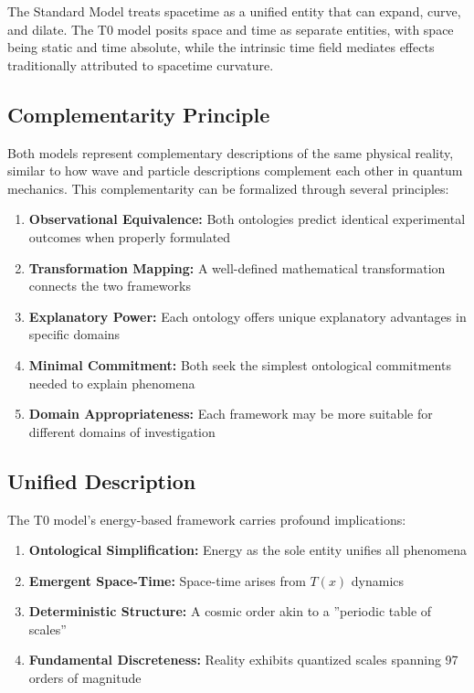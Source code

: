 \documentclass[aps,prl,twocolumn,superscriptaddress,nofootinbib]{revtex4-2}
\newcommand{\Tfield}{T(x)}
\begin{document}
	The Standard Model treats spacetime as a unified entity that can expand, curve, and dilate. The T0 model posits space and time as separate entities, with space being static and time absolute, while the intrinsic time field mediates effects traditionally attributed to spacetime curvature.
	
	\subsection{Complementarity Principle}
	\label{subsec:complementarity}
	
	Both models represent complementary descriptions of the same physical reality, similar to how wave and particle descriptions complement each other in quantum mechanics. This complementarity can be formalized through several principles:
	
	\begin{enumerate}
		\item \textbf{Observational Equivalence:} Both ontologies predict identical experimental outcomes when properly formulated
		\item \textbf{Transformation Mapping:} A well-defined mathematical transformation connects the two frameworks
		\item \textbf{Explanatory Power:} Each ontology offers unique explanatory advantages in specific domains
		\item \textbf{Minimal Commitment:} Both seek the simplest ontological commitments needed to explain phenomena
		\item \textbf{Domain Appropriateness:} Each framework may be more suitable for different domains of investigation
	\end{enumerate}
	
	\subsection{Unified Description}
	\label{subsec:unified_description}
	
	The T0 model's energy-based framework carries profound implications:
	\begin{enumerate}
		\item \textbf{Ontological Simplification:} Energy as the sole entity unifies all phenomena
		\item \textbf{Emergent Space-Time:} Space-time arises from $\Tfield$ dynamics
		\item \textbf{Deterministic Structure:} A cosmic order akin to a ''periodic table of scales''
		\item \textbf{Fundamental Discreteness:} Reality exhibits quantized scales spanning 97 orders of magnitude
	\end{enumerate}
	
\end{document}
